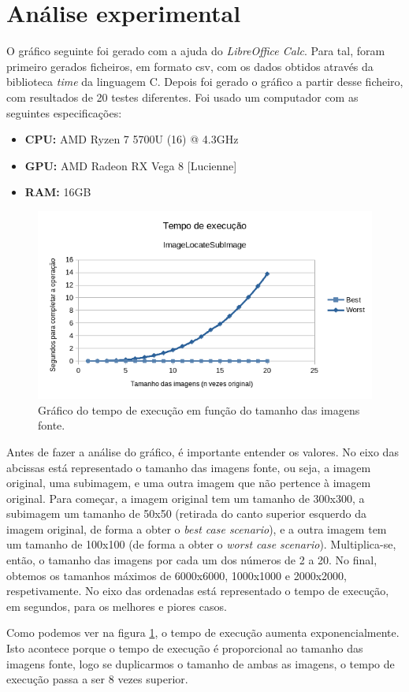 \section{Análise experimental}
\label{sec:imagelocatesubimage/experimental}

O gráfico seguinte foi gerado com a ajuda do \textit{LibreOffice Calc}. Para tal, foram primeiro gerados ficheiros, em formato csv, com os dados obtidos através da biblioteca \textit{time} da linguagem C. Depois foi gerado o gráfico a partir desse ficheiro, com resultados de 20 testes diferentes. Foi usado um computador com as seguintes especificações:

\begin{itemize}
    \item \textbf{CPU:} AMD Ryzen 7 5700U (16) @ 4.3GHz
    \item \textbf{GPU:} AMD Radeon RX Vega 8 [Lucienne]
    \item \textbf{RAM:} 16GB
\end{itemize}

\begin{figure}[H]
    \centering
    \includegraphics[width=\linewidth]{images/locatesubimage_chart.png}
    \caption{Gráfico do tempo de execução em função do tamanho das imagens fonte.}
    \label{fig:imageblur/locatesubimage_chart}
\end{figure}

Antes de fazer a análise do gráfico, é importante entender os valores. No eixo das abcissas está representado o tamanho das imagens fonte, ou seja, a imagem original, uma subimagem, e uma outra imagem que não pertence à imagem original. Para começar, a imagem original tem um tamanho de 300x300, a subimagem um tamanho de 50x50 (retirada do canto superior esquerdo da imagem original, de forma a obter o \textit{best case scenario}), e a outra imagem tem um tamanho de 100x100 (de forma a obter o \textit{worst case scenario}). Multiplica-se, então, o tamanho das imagens por cada um dos números de 2 a 20. No final, obtemos os tamanhos máximos de 6000x6000, 1000x1000 e 2000x2000, respetivamente. No eixo das ordenadas está representado o tempo de execução, em segundos, para os melhores e piores casos.

Como podemos ver na figura \ref{fig:imageblur/locatesubimage_chart}, o tempo de execução aumenta exponencialmente. Isto acontece porque o tempo de execução é proporcional ao tamanho das imagens fonte, logo se duplicarmos o tamanho de ambas as imagens, o tempo de execução passa a ser 8 vezes superior.